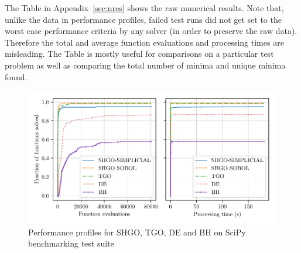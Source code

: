 The Table in Appendix~\ref{sec:nres} shows the raw numerical results. Note that, unlike the data in performance profiles, failed test runs did not get set to the worst case performance criteria by any solver (in order to preserve the raw data). Therefore the total and average function evaluations and processing times are misleading. The Table is mostly useful for comparisons on a particular test problem as well as comparing the total number of minima and unique minima found.





\begin{figure} %
\centerline{\includegraphics[scale=0.83]{./Fig12.pdf}}
{\caption{Performance profiles for SHGO, TGO, DE and BH on SciPy benchmarking test suite} \label{fig:pprofile}} 
\end{figure}

